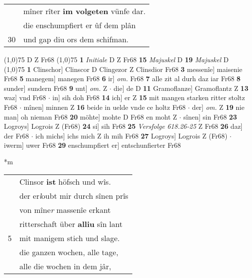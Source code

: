 \documentclass[8pt,a4paper,notitlepage]{article}
\begin{document}
\begin{table}[ht]
\begin{minipage}[t]{0.5\linewidth}
\begin{tabular}{rl}
 & mîner rîter \textbf{im volgeten} vünfe dar.\\ 
 & die enschumpfiert er ûf dem plân\\ 
30 & und gap diu ors dem schifman.\\ 
\end{tabular}
\scriptsize
\line(1,0){75} \newline
D Z Fr68 \newline
\line(1,0){75} \newline
\textbf{1} \textit{Initiale} D Z Fr68  \textbf{15} \textit{Majuskel} D  \textbf{19} \textit{Majuskel} D  \newline
\line(1,0){75} \newline
\textbf{1} Clinschor] Clinscor D Clingezor Z Clinsdior Fr68 \textbf{3} messenîe] maisenie Fr68 \textbf{5} manegem] manegen Fr68 \textbf{6} ir] \textit{om.} Fr68 \textbf{7} alle zit al durh daz iar Fr68 \textbf{8} sunder] sundern Fr68 \textbf{9} unt] \textit{om.} Z  $\cdot$ die] de D \textbf{11} Gramoflanze] Gramoflantz Z \textbf{13} waz] vnd Fr68  $\cdot$ in] sih doh Fr68 \textbf{14} ich] er Z \textbf{15} mit mangen starken ritter stoltz Fr68  $\cdot$ mînen] minnen Z \textbf{16} beide in uelde vnde ce holtz Fr68  $\cdot$ der] \textit{om.} Z \textbf{19} nie man] oh nieman Fr68 \textbf{20} möhte] mohte D Fr68 en moht Z  $\cdot$ sînen] sin Fr68 \textbf{23} Logroys] Logrois Z (Fr68) \textbf{24} si] sih Fr68 \textbf{25} \textit{Versfolge 618.26-25} Z Fr68  \textbf{26} daz] der Fr68  $\cdot$ ich michs] ichs mich Z ih mih Fr68 \textbf{27} Logroys] Logrois Z (Fr68)  $\cdot$ iwerm] uwer Fr68 \textbf{29} enschumpfiert er] entschunfierter Fr68 \newline
\end{minipage}
\hspace{0.5cm}
\begin{minipage}[t]{0.5\linewidth}
\small
\begin{center}*m
\end{center}
\begin{tabular}{rl}
 & Clinsor \textbf{ist} höfsch und wîs.\\ 
 & der er\textit{l}oubt mir durch sînen prîs\\ 
 & von mîne\textit{r} massenîe erkant\\ 
 & ritterschaft über \textbf{alliu} sîn lant\\ 
5 & mit manigem stich und slage.\\ 
 & die ganzen wochen, alle tage,\\ 
 & alle die wochen in dem jâr,\\ 

\end{tabular}
\end{minipage}
\end{table}
\end{document}
